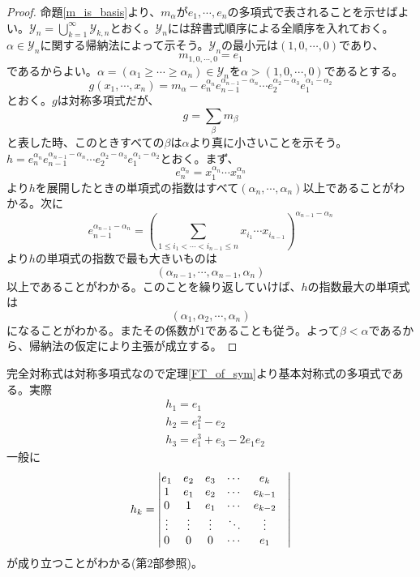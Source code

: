\documentclass{ltjsreport}
\begin{document}
\begin{proof}
    命題\ref{m_is_basis}より、$m_\alpha$が$e_1,\cdots,e_n$の多項式で表されることを示せばよい。$\mathcal{Y}_n=\bigcup_{k=1}^\infty\mathcal{Y}_{k,n}$とおく。$\mathcal{Y}_n$には辞書式順序による全順序を入れておく。$\alpha\in\mathcal{Y}_n$に関する帰納法によって示そう。$\mathcal{Y}_n$の最小元は$(1,0,\cdots,0)$であり、
    \[
    m_{1,0,\cdots,0}=e_1    
    \]
    であるからよい。$\alpha=(\alpha_1\geq\cdots\geq\alpha_n)\in\mathcal{Y}_n$を$\alpha>(1,0,\cdots,0)$であるとする。
    \[
        g(x_1,\cdots,x_n)=m_\alpha-e_n^{\alpha_n}e_{n-1}^{\alpha_{n-1}-\alpha_n}\cdots e_2^{\alpha_2-\alpha_3}e_1^{\alpha_1-\alpha_2} 
    \]
    とおく。$g$は対称多項式だが、
    \[
    g=\sum_{\beta}m_\beta    
    \]
    と表した時、このときすべての$\beta$は$\alpha$より真に小さいことを示そう。$h=e_n^{\alpha_n}e_{n-1}^{\alpha_{n-1}-\alpha_n}\cdots e_2^{\alpha_2-\alpha_3}e_1^{\alpha_1-\alpha_2}$とおく。まず、
    \[
    e_n^{\alpha_n}=x_1^{\alpha_n}\cdots x_n^{\alpha_n}    
    \]
    より$h$を展開したときの単項式の指数はすべて$(\alpha_n,\cdots,\alpha_n)$以上であることがわかる。次に
    \[
    e_{n-1}^{\alpha_{n-1}-\alpha_n}=\left(\sum_{1\leq i_1<\cdots<i_{n-1}\leq n}x_{i_1}\cdots x_{i_{n-1}}\right)^{\alpha_{n-1}-\alpha_n}
    \]
    より$h$の単項式の指数で最も大きいものは
    \[
    (\alpha_{n-1},\cdots,\alpha_{n-1},\alpha_n)    
    \]
    以上であることがわかる。このことを繰り返していけば、$h$の指数最大の単項式は
    \[
    (\alpha_1,\alpha_2,\cdots,\alpha_n)    
    \]
    になることがわかる。またその係数が$1$であることも従う。よって$\beta <\alpha$であるから、帰納法の仮定により主張が成立する。
\end{proof}

\begin{eg}
    完全対称式は対称多項式なので定理\ref{FT_of_sym}より基本対称式の多項式である。実際
    \begin{align*}
        &h_1=e_1\\
        &h_2=e_1^2-e_2\\
        &h_3=e_1^3+e_3-2e_1e_2
    \end{align*}
    一般に
    \[
    h_k=\begin{vmatrix} e_1&e_2&e_3&\cdots&e_k\\
              1&e_1&e_2&\cdots&e_{k-1}\\
              0&1&e_1&\cdots&e_{k-2}\\
              \vdots&\vdots&\vdots&\ddots&\vdots&\\
              0&0&0&\cdots&e_1 \end{vmatrix}
    \]
    が成り立つことがわかる(第2部参照)。
\end{eg}
\end{document}
